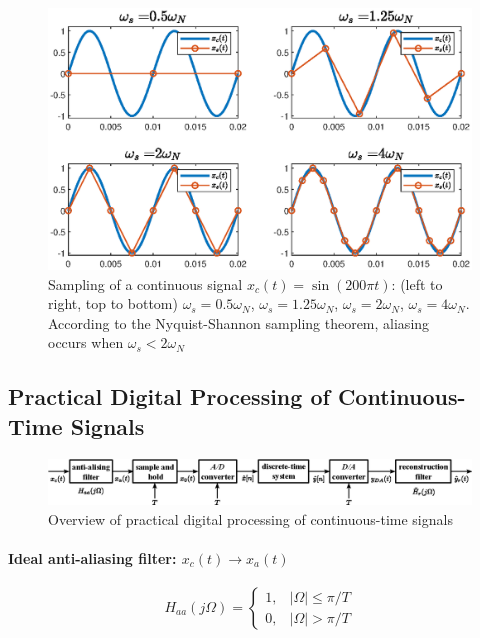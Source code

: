 \begin{figure}[H]
    \centering
    \includegraphics[width=.95\textwidth, center]{images/nyquist.eps}
    \caption{Sampling of a continuous signal $x_{c}(t)=\sin(200\pi t)$: (left to right, top to bottom) $\omega_{s}=0.5\omega_{N}$, $\omega_{s}=1.25\omega_{N}$, $\omega_{s}=2\omega_{N}$, $\omega_{s}=4\omega_{N}$. According to the Nyquist-Shannon sampling theorem, aliasing occurs when $\omega_{s} < 2\omega_{N}$}
    \label{fig:nyquist}
\end{figure}

\subsection{Practical Digital Processing of Continuous-Time Signals}
\begin{figure}[H]
    \centering
    \includegraphics[width=\textwidth]{images/digital-processing-of-continuous-signals.eps}
    \caption{Overview of practical digital processing of continuous-time signals}
    \label{fig:dsp}
\end{figure}

\paragraph{Ideal anti-aliasing filter: $x_{c}(t) \to x_{a}(t)$}
\[
    H_{aa}(j\Omega) = 
    \begin{cases}
    1,  & \lvert \Omega \rvert \leq \pi/T \\
    0,  & \lvert \Omega \rvert > \pi/T
    \end{cases}
\]


